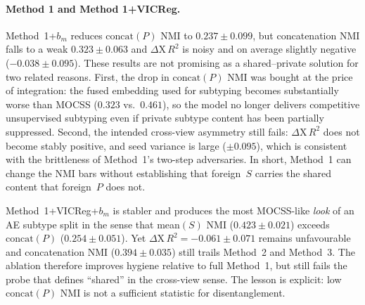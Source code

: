 \paragraph{Method 1 and Method 1+VICReg.}
Method~1+$b_m$ reduces $\mathrm{concat}(P)$ NMI to $0.237\pm0.099$, but concatenation NMI falls to a weak $0.323\pm0.063$ and $\Delta\mathrm{X}\,R^{2}$ is noisy and on average slightly negative ($-0.038\pm0.095$). These results are not promising as a shared--private solution for two related reasons. First, the drop in $\mathrm{concat}(P)$ NMI was bought at the price of integration: the fused embedding used for subtyping becomes substantially worse than MOCSS ($0.323$ vs.\ $0.461$), so the model no longer delivers competitive unsupervised subtyping even if private subtype content has been partially suppressed. Second, the intended cross-view asymmetry still fails: $\Delta\mathrm{X}\,R^{2}$ does not become stably positive, and seed variance is large ($\pm0.095$), which is consistent with the brittleness of Method~1's two-step adversaries. In short, Method~1 can change the NMI bars without establishing that foreign~$S$ carries the shared content that foreign~$P$ does not.

Method~1+VICReg+$b_m$ is stabler and produces the most MOCSS-like \emph{look} of an AE subtype split in the sense that mean$(S)$ NMI ($0.423\pm0.021$) exceeds $\mathrm{concat}(P)$ ($0.254\pm0.051$). Yet $\Delta\mathrm{X}\,R^{2}=-0.061\pm0.071$ remains unfavourable and concatenation NMI ($0.394\pm0.035$) still trails Method~2 and Method~3. The ablation therefore improves hygiene relative to full Method~1, but still fails the probe that defines ``shared'' in the cross-view sense. The lesson is explicit: low $\mathrm{concat}(P)$ NMI is not a sufficient statistic for disentanglement.

